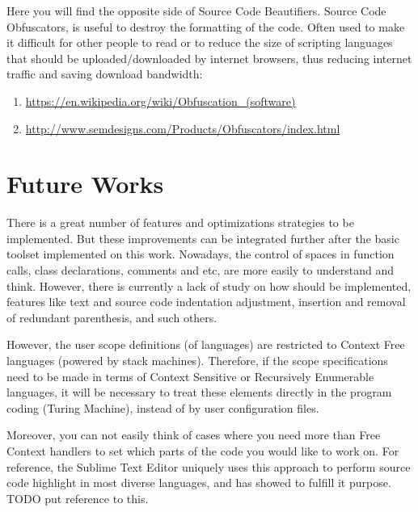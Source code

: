 Here you will find the opposite side of Source Code Beautifiers.
Source Code Obfuscators,
is useful to destroy the formatting of the code.
Often used to make it difficult for other people to read or to reduce the size of scripting languages that should be
uploaded/downloaded by internet browsers,
thus reducing internet traffic and saving download bandwidth:

\begin{sloppypar}
\begin{bluebox}\RaggedRight
\begin{enumerate}[leftmargin=*,parsep=0pt]

\item \url{https://en.wikipedia.org/wiki/Obfuscation_(software)}

\item \url{http://www.semdesigns.com/Products/Obfuscators/index.html}

\end{enumerate}
\end{bluebox}
\end{sloppypar}


\section{Future Works}

There is a great number of features and optimizations strategies to be implemented.
But these improvements can be integrated further after the basic toolset implemented on this work.
Nowadays,
the control of spaces in function calls,
class declarations, comments and etc,
are more easily to understand and think.
However,
there is currently a lack of study on how should be implemented,
features like text and source code indentation adjustment,
insertion and removal of redundant parenthesis, and such others.

However,
the user scope definitions (of languages) are restricted to Context Free languages (powered by stack machines).
Therefore,
if the scope specifications need to be made in terms of Context Sensitive or Recursively Enumerable languages,
it will be necessary to treat these elements directly in the program coding (Turing Machine),
instead of by user configuration files.

Moreover,
you can not easily think of cases where you need more than Free Context handlers to set which parts of the code you
would like to work on.
For reference,
the Sublime Text Editor uniquely uses this approach to perform source code highlight in most diverse languages,
and has showed to fulfill it purpose.
TODO put reference to this.



